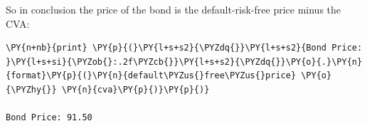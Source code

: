 So in conclusion the price of the bond is the default-risk-free price minus the CVA:

\begin{tcolorbox}[breakable, size=fbox, boxrule=1pt, pad at break*=1mm,colback=cellbackground, colframe=cellborder]
\begin{Verbatim}[commandchars=\\\{\}]
\PY{n+nb}{print} \PY{p}{(}\PY{l+s+s2}{\PYZdq{}}\PY{l+s+s2}{Bond Price: }\PY{l+s+si}{\PYZob{}:.2f\PYZcb{}}\PY{l+s+s2}{\PYZdq{}}\PY{o}{.}\PY{n}{format}\PY{p}{(}\PY{n}{default\PYZus{}free\PYZus{}price} \PY{o}{\PYZhy{}} \PY{n}{cva}\PY{p}{)}\PY{p}{)}

Bond Price: 91.50
\end{Verbatim}
\end{tcolorbox}

